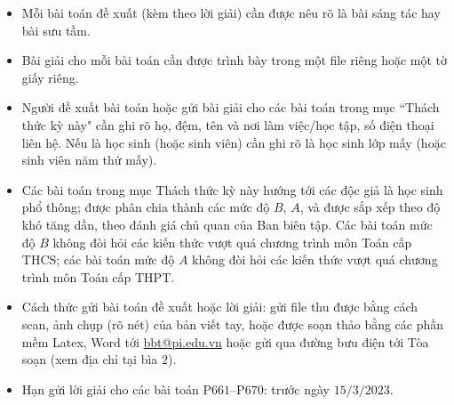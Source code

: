 \thispagestyle{thachthuctoanhocnone}
\pagestyle{thachthuctoanhoc}
\everymath{\color{thachthuctoanhoc}}
\graphicspath{{../thachthuctoanhoc/pic/}}
\begingroup
{}
\centering
\vspace*{4cm}
\endgroup
\vspace*{-8pt}
\begin{tBox}
	\begin{itemize}[leftmargin = 13pt, itemsep = 1.0pt] 
		\item Mỗi bài toán đề xuất (kèm theo lời giải) cần được nêu rõ là bài sáng tác hay bài sưu tầm.
		\item Bài giải cho mỗi bài toán cần được trình bày trong một file riêng hoặc
		một tờ giấy riêng.
		\item  Người đề xuất bài toán hoặc gửi bài giải cho các bài toán trong mục ``Thách thức kỳ này" cần ghi rõ họ, đệm, tên và nơi làm việc/học tập, số điện thoại liên hệ. Nếu là học sinh (hoặc sinh viên) cần ghi rõ là học sinh lớp mấy (hoặc sinh viên năm thứ mấy).
		\item Các bài toán trong mục Thách thức kỳ này hướng tới các độc giả là học sinh phổ thông; được phân chia thành các mức độ $B$, $A$, và được sắp xếp theo độ khó tăng dần, theo đánh giá chủ quan của Ban biên tập. Các bài toán mức độ $B$ không đòi hỏi các kiến thức vượt quá chương trình môn Toán cấp THCS; các bài toán mức độ $A$ không đòi hỏi các kiến thức vượt quá chương trình môn Toán cấp THPT.
		\item Cách thức gửi bài toán đề xuất hoặc lời giải: gửi file thu được bằng cách scan, ảnh chụp (rõ nét) của bản viết tay, hoặc được soạn thảo bằng các phần mềm Latex, Word tới \url{bbt@pi.edu.vn} hoặc gửi qua đường bưu điện tới Tòa soạn (xem địa chỉ tại bìa $2$).
		\item Hạn gửi lời giải cho các bài toán P$661$--P$670$: trước ngày $15/3/2023$.
	\end{itemize}
\end{tBox}

